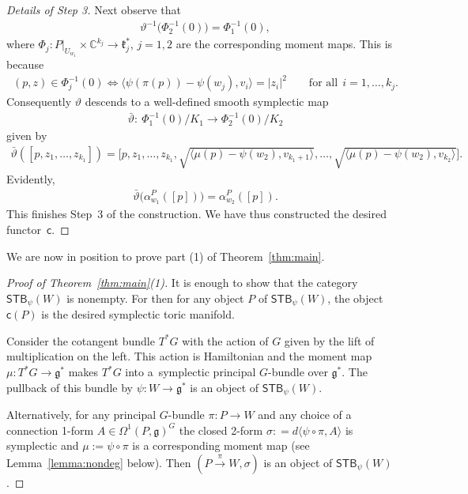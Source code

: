 \documentclass[pdftex]{sigma}
\numberwithin{equation}{section}
\begin{document}
\begin{proof}[Details of Step 3]
Next observe that
\begin{gather*}
\vartheta^{-1} \big(\Phi_2 ^{-1} (0)\big) = \Phi_1 ^{-1} (0),
\end{gather*}
where $\Phi_j\colon P|_{U_{w_1}}\times {\mathbb C}^{k_j}\to {\mathfrak k}_j^*$, $j=1,2$ are
the corresponding moment maps.  This is because
\begin{gather*}
(p,z)\in \Phi_j^{-1} (0)\Leftrightarrow
\langle \psi(\pi(p)) - \psi(w_j), v_i\rangle = |z_i|^2
\qquad\textrm{for all} \ \ i=1,\ldots, k_j .
\end{gather*}
Consequently $\vartheta$ descends to a well-def\/ined smooth symplectic map
\begin{gather*}
\bar{\vartheta}\colon \  \Phi_1^{-1} (0)/K_1 \to \Phi_2 ^{-1} (0)/K_2
\end{gather*}
given by
\begin{gather*}
\bar{\vartheta}([p, z_1,\ldots,z_{k_1}]) = \Big[p, z_1,\ldots,z_{k_1},
\sqrt{\langle   \mu(p) - \psi(w_2),v_{k_1+1} \rangle},\ldots ,
\sqrt{\langle \mu(p) -  \psi(w_2),v_{k_2} \rangle }\Big].
\end{gather*}
Evidently,
\begin{gather*}
\bar{\vartheta} \big(\alpha^P_{w_1}([p])\big) = \alpha^P_{w_2}([p]).
\end{gather*}
This f\/inishes Step~3 of the construction.  We have thus constructed
the desired functor~${\textsf{c}}$.
\end{proof}

We are now in position to prove part (1) of Theorem~\ref{thm:main}.

\begin{proof}[Proof of Theorem~\ref{thm:main}(1)]
  It is enough to show that the category ${\textsf{STB}}_\psi (W)$ is nonempty.
  For then for any object $P$ of ${\textsf{STB}}_\psi (W)$, the object ${\textsf{c}} (P)$
  is the desired symplectic toric manifold.

  Consider the cotangent bundle $T^*G$ with the action of $G$ given by
  the lift of multiplication on the left.  This action is Hamiltonian
  and the moment map $\mu\colon T^*G\to {\mathfrak g}^*$ makes $T^*G$ into a~symplectic principal $G$-bundle over ${\mathfrak g}^*$.  The pullback of this
  bundle by $\psi\colon W\to {\mathfrak g}^*$ is an object of ${\textsf{STB}}_\psi (W)$.

  Alternatively, for any principal $G$-bundle $\pi\colon P\to W$ and any
  choice of a connection 1-form $A\in \Omega^1(P,{\mathfrak g})^G$ the closed
  2-form $\sigma: = d\langle \psi \circ \pi ,A\rangle$ is symplectic
  and $\mu:= \psi \circ \pi$ is a corresponding moment map (see
  Lemma~\ref{lemma:nondeg} below). Then $(P\xrightarrow{\pi} W,
  \sigma)$ is an object of ${\textsf{STB}}_\psi (W)$.
\end{proof}
\end{document}
